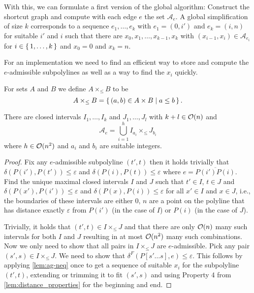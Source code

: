 With this, we can formulate a first version of the global \citeauthor{computational_geometric_methods_for_polygonal_approximations_of_a_curve} algorithm: Construct the shortcut graph and compute with each edge \(e\) the set \(\mathcal{A}_e\). A global simplification of size \(k\) corresponds to a sequence \(e_1, \dots, e_k\) with \(e_1 = (0, i')\) and \(e_k = (i, n)\) for suitable \(i'\) and \(i\) such that there are \(x_0, x_1, \dots, x_{k-1}, x_k\) with \((x_{i-1}, x_{i}) \in \mathcal{A}_{e_i}\) for \(i \in \set{1, \dots, k}\) and \(x_0 = 0\) and \(x_k = n\).

For an implementation we need to find an efficient way to store and compute the \(e\)-admissible subpolylines as well as a way to find the \(x_i\) quickly. 

\begin{definition}
	For sets \(A\) and \(B\) we define \(A \times_{\leq} B\) to be 
		\[A \times_{\leq} B = \set{(a, b) \in A \times B \mid a \leq b}.\]
\end{definition}

\begin{lemma}\label{lem:admissible-rep}
	There are closed intervals \(I_1, \dots, I_k\) and \(J_1, \dots, J_l\) with \(k + l \in \mathcal{O}(n)\) and 
	\[\mathcal{A}_e =  \bigcup_{i=1}^h I_{a_i} \times_{\leq} J_{b_i}\] 
	where \(h \in \mathcal{O}(n^2)\) and \(a_i\) and \(b_i\) are suitable integers.
\end{lemma}

\begin{proof}
	Fix any \(e\)-admissible subpolyline \((t', t)\) then it holds trivially that \(\delta(P(i'), P(t')) \leq \varepsilon\) and \(\delta(P(i), P(t)) \leq \varepsilon\) where \(e = \overline{P(i')P(i)}\). Find the unique maximal closed intervals \(I\) and \(J\) such that \(t' \in I\), \(t \in J\) and \(\delta(P(x'), P(i')) \leq \varepsilon\) and \(\delta(P(x), P(i)) \leq \varepsilon\) for all \(x' \in I\) and \(x \in J\), i.e., the boundaries of these intervals are either \(0\), \(n\) are a point on the polyline that has distance exactly \(\varepsilon\) from \(P(i')\) (in the case of \(I\)) or \(P(i)\) (in the case of \(J\)).

	Trivially, it holds that \((t', t) \in I \times_{\leq} J\) and that there are only \(\mathcal{O}(n)\) many such intervals for both \(I\) and \(J\) resulting in at most \(\mathcal{O}(n^2)\) many such combinations. Now we only need to show that all pairs in \(I \times_{\leq} J\) are \(e\)-admissible. Pick any pair \((s', s) \in I \times_{\leq} J\). We need to show that \(\delta^F(P[s' \dots s], e) \leq \varepsilon\). This follows by applying \cref{lem:ag-neq} once to get a sequence of suitable \(x_i\) for the subpolyline \((t', t)\), extending or trimming it to fit \((s', s)\) and using Property 4 from \cref{lem:distance_properties} for the beginning and end.
\end{proof}

